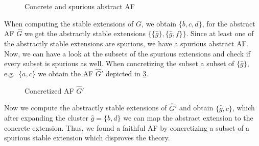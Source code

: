 \begin{example}
\begin{figure}[h]
\begin{subfigure}[t]{0.45\textwidth}
\begin{tikzpicture}
    \end{tikzpicture}
    \label{af:implementationRefutedTheoryB}
    \end{subfigure}%
\caption{Concrete and spurious abstract AF}
\label{fig:AlgorithmRefutedTheoryDefinition}
\end{figure}
\vspace{0.3cm}

When computing the stable extensions of $G$, we obtain $\bigl\{b, c, d\bigl\}$, for the abstract AF $\hat{G}$ we get the abstractly stable extensions $\bigl\{ \{\hat{g}\}, \{\hat{g}, f\}\bigl\}$. Since at least one of the abstractly stable extensions are spurious, we have a spurious abstract AF. Now, we can have a look at the subsets of the spurious extensions and check if every subset is spurious as well. When concretizing the subset a subset of $\{\hat{g}\}$, e.g.\ $\{a, c\}$ we obtain the AF $\hat{G}'$ depicted in \cref{af:ImplementationRefutedTheoryDefinitionSpurious}.


\vspace{0.3cm}
\begin{figure}[h]
    \centering
\caption{Concretized AF $\hat{G}'$}
\label{af:ImplementationRefutedTheoryDefinitionSpurious}
\end{figure}
\vspace{0.3cm}

Now we compute the abstractly stable extensions of $\hat{G}'$ and obtain $\{\hat{g}, c\}$, which after expanding the cluster $\hat{g}=\{b, d\}$ we can map the abstract extension to the concrete extension. Thus, we found a faithful AF by concretizing a subset of a spurious stable extension which disproves the theory.

\end{example}
